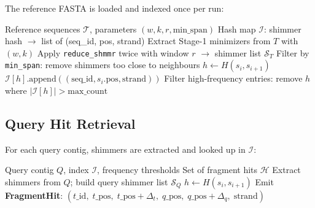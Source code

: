 \documentclass[11pt,a4paper]{article}
\begin{document}
The reference FASTA is loaded and indexed once per run:

\begin{algorithm}[H]
\caption{Reference shimmer index construction}
\begin{algorithmic}[1]
\Require Reference sequences $\mathcal{T}$, parameters $(w,k,r,\text{min\_span})$
\Ensure Hash map $\mathcal{I}$: shimmer hash $\to$ list of (seq\_id, pos, strand)
  \State Extract Stage-1 minimizers from $T$ with $(w,k)$
  \State Apply \texttt{reduce\_shmmr} twice with window $r$ $\to$ shimmer list $\mathcal{S}_T$
  \State Filter by \texttt{min\_span}: remove shimmers too close to neighbours
    \State $h \gets H(s_i, s_{i+1})$  
    \State $\mathcal{I}[h].\text{append}((\text{seq\_id}, s_i.\text{pos}, \text{strand}))$
  \EndFor
\EndFor
\State Filter high-frequency entries: remove $h$ where $|\mathcal{I}[h]| > \text{max\_count}$
\end{algorithmic}
\end{algorithm}

\subsection{Query Hit Retrieval}

For each query contig, shimmers are extracted and looked up in $\mathcal{I}$:

\begin{algorithm}[H]
\caption{Query shimmer hit retrieval}
\begin{algorithmic}[1]
\Require Query contig $Q$, index $\mathcal{I}$, frequency thresholds
\Ensure Set of fragment hits $\mathcal{H}$
\State Extract shimmers from $Q$; build query shimmer list $\mathcal{S}_Q$
  \State $h \gets H(s_i, s_{i+1})$
      \State Emit \textbf{FragmentHit}: $(t\_\text{id},\; t\_\text{pos},\; t\_\text{pos}+\Delta_t,\;
                                          q\_\text{pos},\; q\_\text{pos}+\Delta_q,\; \text{strand})$
    \EndFor
  \EndIf
\EndFor
\end{algorithmic}
\end{algorithm}

\end{document}
